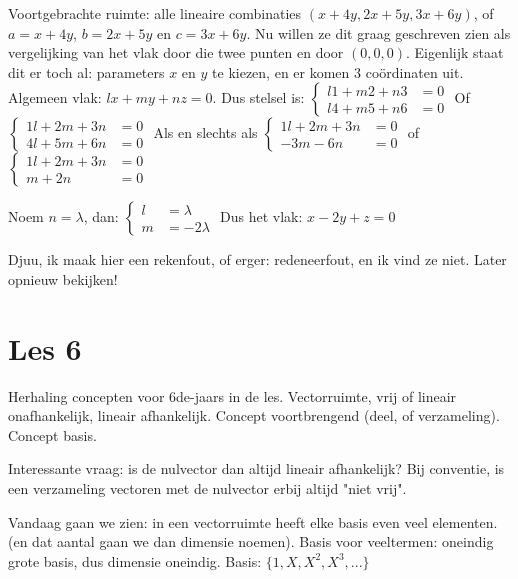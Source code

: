 \documentclass{article}
\begin{document}
Voortgebrachte ruimte: alle lineaire combinaties $(x+4y, 2x+5y, 3x+6y)$, of $a=x+4y$, $b=2x+5y$ en $c=3x+6y$. 
Nu willen ze dit graag geschreven zien als vergelijking van het vlak door die twee punten en door $(0,0,0)$. 
Eigenlijk staat dit er toch al: parameters $x$ en $y$ te kiezen, en er komen 3 co\"ordinaten uit. 
Algemeen vlak: $lx + my + nz = 0$. Dus stelsel is: 
$\left\{ \begin{aligned}
l1 + m2 + n3 &= 0 \\
l4 + m5 + n6 &= 0 
\end{aligned} \right.$ 
Of 
$\left\{ \begin{aligned}
1l + 2m + 3n &= 0 \\
4l + 5m + 6n &= 0 
\end{aligned} \right.$ 
Als en slechts als
$\left\{ \begin{aligned}
1l + 2m + 3n &= 0 \\
   - 3m - 6n &= 0 
\end{aligned} \right.$ 
of
$\left\{ \begin{aligned}
1l + 2m + 3n &= 0 \\
    m + 2n &= 0 
\end{aligned} \right.$ 

Noem $n=\lambda$, dan: 
$\left\{ \begin{aligned}
l  &=  \lambda \\
m &= -2 \lambda
\end{aligned} \right.$ 
Dus het vlak: $x -2  y + z = 0$

Djuu, ik maak hier een rekenfout, of erger: redeneerfout, en ik vind ze niet. Later opnieuw bekijken! 

\section*{Les 6}

Herhaling concepten voor 6de-jaars in de les. Vectorruimte, vrij of lineair onafhankelijk, lineair afhankelijk. Concept voortbrengend (deel, of verzameling). Concept basis. 

Interessante vraag: is de nulvector dan altijd lineair afhankelijk? Bij conventie, is een verzameling vectoren met de nulvector erbij altijd "niet vrij". 

Vandaag gaan we zien: in een vectorruimte heeft elke basis even veel elementen. (en dat aantal gaan we dan dimensie noemen). 
Basis voor veeltermen: oneindig grote basis, dus dimensie oneindig. Basis: $\{1, X, X^2, X^3,...  \}$
\end{document}
